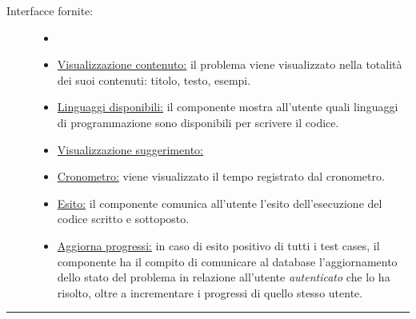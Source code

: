 \documentclass[11pt, a4paper]{article}
\theoremstyle{definition} %
\begin{document}
\begin{description}
    \item[Interfacce fornite:]
    \begin{itemize}
        \item[]

        \item \underline{Visualizzazione contenuto:} il problema viene visualizzato nella
        totalità dei suoi contenuti: titolo, testo, esempi.

        \item \underline{Linguaggi disponibili:} il componente mostra all'utente quali
        linguaggi di programmazione sono disponibili per scrivere il codice.

        \item \underline{Visualizzazione suggerimento:}

        \item \underline{Cronometro:} viene visualizzato il tempo registrato dal
        cronometro.

        \item \underline{Esito:} il componente comunica all'utente l'esito dell'esecuzione
        del codice scritto e sottoposto.

        \item \underline{Aggiorna progressi:} in caso di esito positivo di tutti i
        test cases, il componente ha il compito di comunicare al database l'aggiornamento
        dello stato del problema in relazione all'utente \textit{autenticato} che lo ha
        risolto, oltre a incrementare i progressi di quello stesso utente.
    \end{itemize}
\end{description}

\begin{center}
    \rule{5cm}{1pt}
\end{center}
\end{document}
